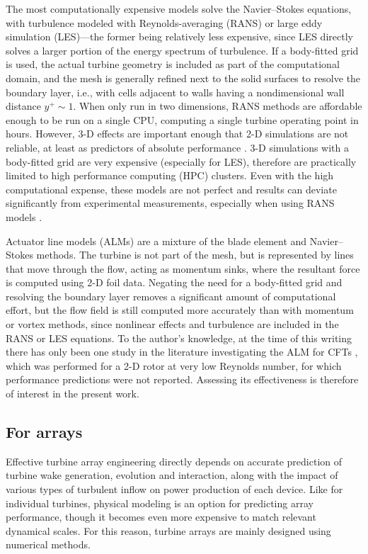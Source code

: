 The most computationally expensive models solve the Navier--Stokes equations,
with turbulence modeled with Reynolds-averaging (RANS) or large eddy simulation
(LES)---the former being relatively less expensive, since LES directly solves a
larger portion of the energy spectrum of turbulence. If a body-fitted grid is
used, the actual turbine geometry is included as part of the computational
domain, and the mesh is generally refined next to the solid surfaces to resolve
the boundary layer, i.e., with cells adjacent to walls having a nondimensional
wall distance $y^+ \sim 1$. When only run in two dimensions, RANS methods are
affordable enough to be run on a single CPU, computing a single turbine
operating point in hours. However, 3-D effects are important enough that 2-D
simulations are not reliable, at least as predictors of absolute performance
\cite{Li2013}. 3-D simulations with a body-fitted grid are very expensive
(especially for LES), therefore are practically limited to high performance
computing (HPC) clusters. Even with the high computational expense, these models
are not perfect and results can deviate significantly from experimental
measurements, especially when using RANS models \cite{Li2013}.

Actuator line models (ALMs) are a mixture of the blade element and
Navier--Stokes methods. The turbine is not part of the mesh, but is represented
by lines that move through the flow, acting as momentum sinks, where the
resultant force is computed using 2-D foil data. Negating the need for a
body-fitted grid and resolving the boundary layer removes a significant amount
of computational effort, but the flow field is still computed more accurately
than with momentum or vortex methods, since nonlinear effects and turbulence are
included in the RANS or LES equations. To the author's knowledge, at the time of
this writing there has only been one study in the literature investigating the
ALM for CFTs \cite{Shamsoddin2014}, which was performed for a 2-D rotor at very
low Reynolds number, for which performance predictions were not reported.
Assessing its effectiveness is therefore of interest in the present work.


\subsection{For arrays}

Effective turbine array engineering directly depends on accurate prediction of
turbine wake generation, evolution and interaction, along with the impact of
various types of turbulent inflow on power production of each device. Like for
individual turbines, physical modeling is an option for predicting array
performance, though it becomes even more expensive to match relevant dynamical
scales. For this reason, turbine arrays are mainly designed using numerical
methods.

